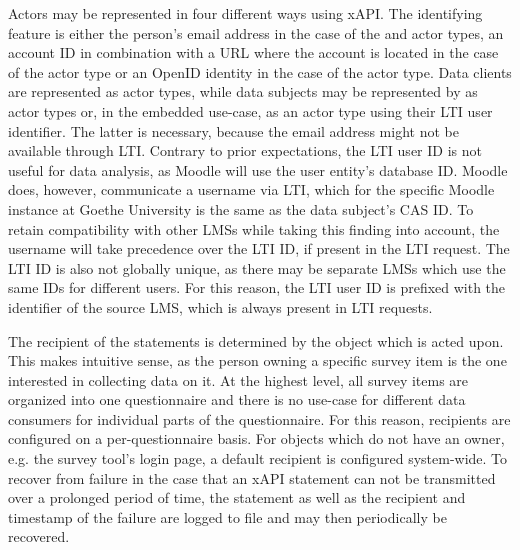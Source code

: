     Actors may be represented in four different ways using xAPI. 
    The identifying feature is either the person's email address in the case
    of the  and  actor types, an account ID 
    in combination with a URL where the account is located in the case of the 
     actor type
    or an OpenID identity in the case of the  actor type.
    Data clients are represented as  actor types, while data subjects may 
    be represented by as  actor types
    or, in the embedded use-case, as an  actor type using their
    LTI user identifier. The latter is necessary, because the email address might not be available
    through LTI. Contrary to prior expectations, the LTI user ID is not
    useful for data analysis, as Moodle will use the user entity's database ID.
    Moodle does, however, communicate a username via LTI, which for the specific Moodle instance
    at Goethe University is the same as the data subject's CAS ID.
    To retain compatibility with other LMSs while taking this finding into account,
    the username will take precedence over the LTI ID, if present in the LTI request.
    The LTI ID is also not globally unique, as there may be separate LMSs which
    use the same IDs for different users. For this reason, the LTI user ID is
    prefixed with the identifier of the source LMS, which is always present in LTI requests.

    The recipient of the statements is determined by the object which is acted upon. 
    This makes intuitive sense, as the person owning a specific survey item is the one interested in
    collecting data on it. At the highest level, all survey items are
    organized into one questionnaire and there is no use-case for different
    data consumers for individual parts of the questionnaire. 
    For this reason, recipients are configured on a per-questionnaire basis.
    For objects which do not have an owner, e.g. the survey tool's login
    page, a default recipient is configured system-wide.
    To recover from failure in the case that an xAPI statement
    can not be transmitted over a prolonged period of time, the
    statement as well as the recipient and timestamp of the failure
    are logged to file and may then periodically be recovered.

